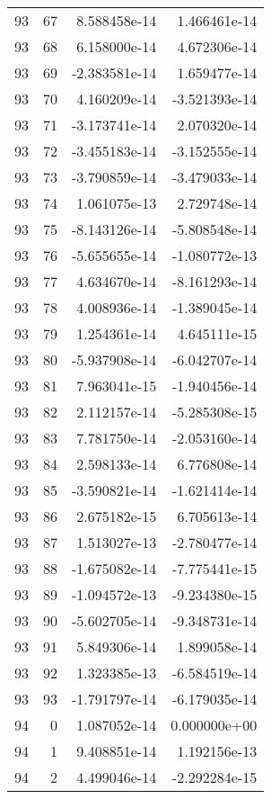 \begin{tabular}{rrrr}
  93 &   67 &  8.588458e-14 &  1.466461e-14 \\
  93 &   68 &  6.158000e-14 &  4.672306e-14 \\
  93 &   69 & -2.383581e-14 &  1.659477e-14 \\
  93 &   70 &  4.160209e-14 & -3.521393e-14 \\
  93 &   71 & -3.173741e-14 &  2.070320e-14 \\
  93 &   72 & -3.455183e-14 & -3.152555e-14 \\
  93 &   73 & -3.790859e-14 & -3.479033e-14 \\
  93 &   74 &  1.061075e-13 &  2.729748e-14 \\
  93 &   75 & -8.143126e-14 & -5.808548e-14 \\
  93 &   76 & -5.655655e-14 & -1.080772e-13 \\
  93 &   77 &  4.634670e-14 & -8.161293e-14 \\
  93 &   78 &  4.008936e-14 & -1.389045e-14 \\
  93 &   79 &  1.254361e-14 &  4.645111e-15 \\
  93 &   80 & -5.937908e-14 & -6.042707e-14 \\
  93 &   81 &  7.963041e-15 & -1.940456e-14 \\
  93 &   82 &  2.112157e-14 & -5.285308e-15 \\
  93 &   83 &  7.781750e-14 & -2.053160e-14 \\
  93 &   84 &  2.598133e-14 &  6.776808e-14 \\
  93 &   85 & -3.590821e-14 & -1.621414e-14 \\
  93 &   86 &  2.675182e-15 &  6.705613e-14 \\
  93 &   87 &  1.513027e-13 & -2.780477e-14 \\
  93 &   88 & -1.675082e-14 & -7.775441e-15 \\
  93 &   89 & -1.094572e-13 & -9.234380e-15 \\
  93 &   90 & -5.602705e-14 & -9.348731e-14 \\
  93 &   91 &  5.849306e-14 &  1.899058e-14 \\
  93 &   92 &  1.323385e-13 & -6.584519e-14 \\
  93 &   93 & -1.791797e-14 & -6.179035e-14 \\
  94 &    0 &  1.087052e-14 &  0.000000e+00 \\
  94 &    1 &  9.408851e-14 &  1.192156e-13 \\
  94 &    2 &  4.499046e-14 & -2.292284e-15 \\

\end{tabular}
